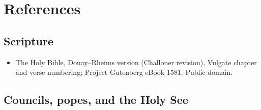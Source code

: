 \section{References}

\begingroup
\setlength{\parskip}{0pt}
\titlespacing*{\subsection}{0pt}{0.3ex}{0.3ex}

\subsection*{Scripture}

{\fontsize{8.6}{9.6}\selectfont
\begin{itemize}[itemsep=0pt,parsep=0pt,topsep=0.05em]
\item The Holy Bible, Douay--Rheims version (Challoner revision), Vulgate chapter and verse numbering; Project Gutenberg eBook 1581. Public domain.
\end{itemize}}

\subsection*{Councils, popes, and the Holy See}

